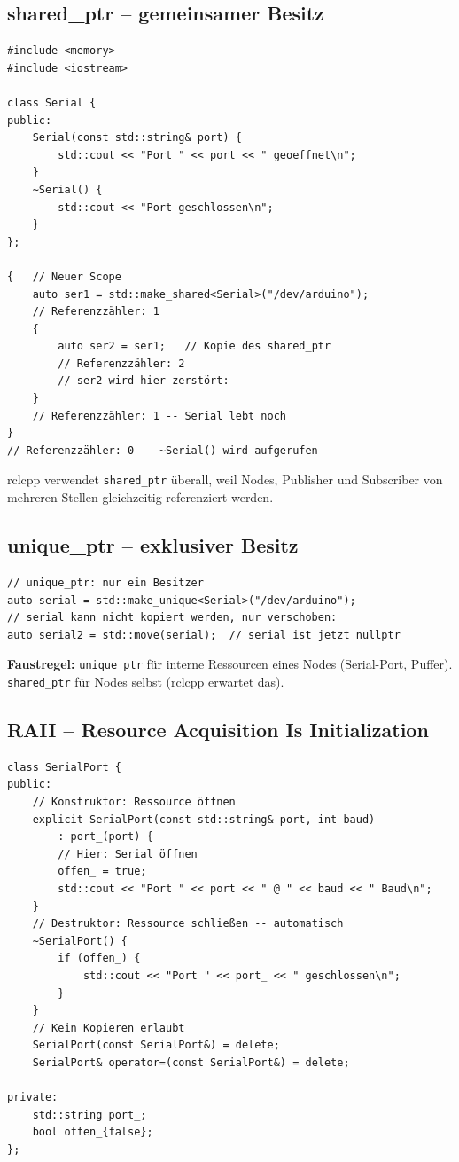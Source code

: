 \subsection{shared\_ptr -- gemeinsamer Besitz}

\begin{lstlisting}[style=cpp]
#include <memory>
#include <iostream>

class Serial {
public:
    Serial(const std::string& port) {
        std::cout << "Port " << port << " geoeffnet\n";
    }
    ~Serial() {
        std::cout << "Port geschlossen\n";
    }
};

{   // Neuer Scope
    auto ser1 = std::make_shared<Serial>("/dev/arduino");
    // Referenzzähler: 1
    {
        auto ser2 = ser1;   // Kopie des shared_ptr
        // Referenzzähler: 2
        // ser2 wird hier zerstört:
    }
    // Referenzzähler: 1 -- Serial lebt noch
}
// Referenzzähler: 0 -- ~Serial() wird aufgerufen
\end{lstlisting}

rclcpp verwendet \texttt{shared\_ptr} überall,
weil Nodes, Publisher und Subscriber
von mehreren Stellen gleichzeitig referenziert werden.

\subsection{unique\_ptr -- exklusiver Besitz}

\begin{lstlisting}[style=cpp]
// unique_ptr: nur ein Besitzer
auto serial = std::make_unique<Serial>("/dev/arduino");
// serial kann nicht kopiert werden, nur verschoben:
auto serial2 = std::move(serial);  // serial ist jetzt nullptr
\end{lstlisting}

\textbf{Faustregel:}
\texttt{unique\_ptr} für interne Ressourcen eines Nodes
(Serial-Port, Puffer).
\texttt{shared\_ptr} für Nodes selbst (rclcpp erwartet das).

\subsection{RAII -- Resource Acquisition Is Initialization}

\begin{lstlisting}[style=cpp]
class SerialPort {
public:
    // Konstruktor: Ressource öffnen
    explicit SerialPort(const std::string& port, int baud)
        : port_(port) {
        // Hier: Serial öffnen
        offen_ = true;
        std::cout << "Port " << port << " @ " << baud << " Baud\n";
    }
    // Destruktor: Ressource schließen -- automatisch
    ~SerialPort() {
        if (offen_) {
            std::cout << "Port " << port_ << " geschlossen\n";
        }
    }
    // Kein Kopieren erlaubt
    SerialPort(const SerialPort&) = delete;
    SerialPort& operator=(const SerialPort&) = delete;

private:
    std::string port_;
    bool offen_{false};
};
\end{lstlisting}

